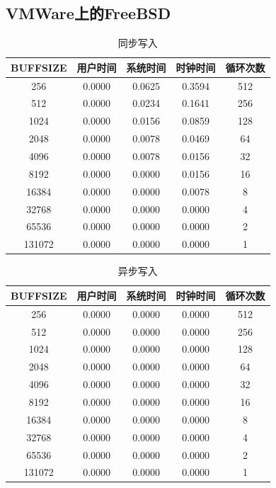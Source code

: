 \documentclass[a4paper,twoside]{article}
\begin{document}
\begin{spacing}{1.2}
\subsection{VMWare上的FreeBSD}


\begin{table}[H]
\centering
\caption{同步写入}
\begin{tabular}{c|c|c|c|c}
	\toprule
	\hline
	BUFFSIZE & 用户时间 & 系统时间 & 时钟时间 & 循环次数 \\
	\hline
	256	     &0.0000	 &0.0625	 &0.3594	&512
	\\512	     &0.0000	 &0.0234	 &0.1641	&256
	\\1024	 &0.0000	 &0.0156	 &0.0859	&128
	\\2048	 &0.0000	 &0.0078	 &0.0469	&64
	\\4096	 &0.0000	 &0.0078	 &0.0156	&32
	\\8192	 &0.0000	 &0.0000	 &0.0156	&16
	\\16384	 &0.0000	 &0.0000	 &0.0078	&8
	\\32768	 &0.0000	 &0.0000	 &0.0000	&4
	\\65536	 &0.0000	 &0.0000	 &0.0000	&2
	\\131072	 &0.0000	 &0.0000	 &0.0000	&1
	\\\hline
	\bottomrule
\end{tabular}	
\end{table}

\begin{table}[H]
\centering
\caption{异步写入}
\begin{tabular}{c|c|c|c|c}
	\toprule
	\hline
	BUFFSIZE & 用户时间 & 系统时间 & 时钟时间 & 循环次数 \\
	\hline
	256	 	 &0.0000	 &0.0000	 &0.0000	&512
	\\512	 	 &0.0000	 &0.0000	 &0.0000	&256
	\\1024	 &0.0000	 &0.0000	 &0.0000	&128
	\\2048	 &0.0000	 &0.0000	 &0.0000	&64
	\\4096	 &0.0000	 &0.0000	 &0.0000	&32
	\\8192	 &0.0000	 &0.0000	 &0.0000	&16
	\\16384	 &0.0000	 &0.0000	 &0.0000	&8
	\\32768	 &0.0000	 &0.0000	 &0.0000	&4
	\\65536	 &0.0000	 &0.0000	 &0.0000	&2
	\\131072	 &0.0000	 &0.0000	 &0.0000	&1
	\\\hline
	\bottomrule
\end{tabular}	
\end{table}


\end{spacing}
\end{document}
